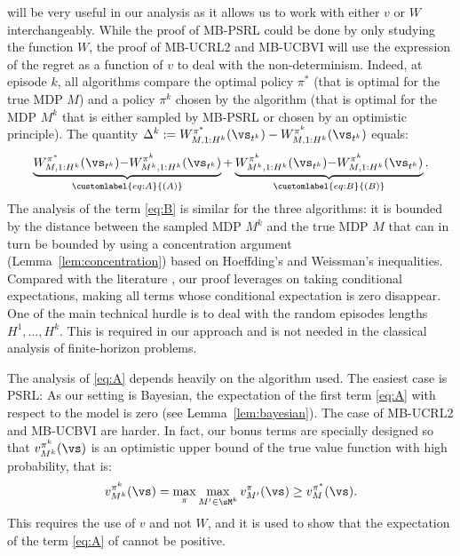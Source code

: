  will be very useful in our analysis as it allows us to work with either $v$ or $W$ interchangeably. While the proof of MB-PSRL could be done by only studying the function $W$, the proof of MB-UCRL2 and MB-UCBVI will use the expression of the regret as a function of $v$ to deal with the non-determinism. Indeed, at episode $k$, all algorithms compare the optimal policy $\pi^*$ (that is optimal for the true MDP $M$) and a policy $\pi^k$ chosen by the algorithm (that is optimal for the MDP $M^k$ that is either sampled by MB-PSRL or chosen by an optimistic principle).  The quantity $\Delta^k := W_{M,1:H^k}^{\pi^*}(\vs_{t^k}) - W_{M,1:H^k}^{\pi^k}(\vs_{t^k})$ equals:
\begin{align}
    \underbrace{W_{M,1:H^k}^{\pi^*}(\vs_{t^k}) {-} W_{M^k,1:H^k}^{\pi^k}(\vs_{t^k})}_{\customlabel{eq:A}{(A)}}%
    + \underbrace{W_{M^k,1:H^k}^{\pi^k}(\vs_{t^k}) {-} W_{M,1:H^k}^{\pi^k}(\vs_{t^k})}_{\customlabel{eq:B}{(B)}}.
    \label{eq:proofAB}%
\end{align}
The analysis of the term \ref{eq:B} is similar for the three algorithms: it is bounded by the distance between the sampled MDP $M^k$ and the true MDP $M$ that can in turn be bounded by using a concentration argument (Lemma~\ref{lem:concentration}) based on Hoeffding's and Weissman's inequalities.  Compared with the literature \cite{azar2017minimax,ouyang2017learning}, our proof leverages on taking conditional expectations, making all terms whose conditional expectation is zero disappear. One of the main technical hurdle is to deal with the random episodes lengths $H^1,\ldots, H^k$.   This is required in our approach and is not needed in the classical analysis of finite-horizon problems.

The analysis of \ref{eq:A} depends heavily on the algorithm used. The easiest case is PSRL: As our setting is Bayesian, the expectation of the first term \ref{eq:A} with respect to the model is zero (see Lemma~\ref{lem:bayesian}).   The case of MB-UCRL2 and MB-UCBVI are harder. In fact, our bonus terms are specially designed so that $v_{M^k}^{\pi^k}(\vs)$ is an optimistic upper bound of the true value function with high probability, that is:
\begin{align}
    \label{eq:optimism}
    v_{M^k}^{\pi^k}(\vs) = \max_{\pi} \max_{M'\in\sM^k} v_{M'}^{\pi}(\vs) \ge v_M^{\pi^*}(\vs).
\end{align}
This requires the use of $v$ and not $W$, and it is used to show that the expectation of the term \ref{eq:A} of  cannot be positive. 

